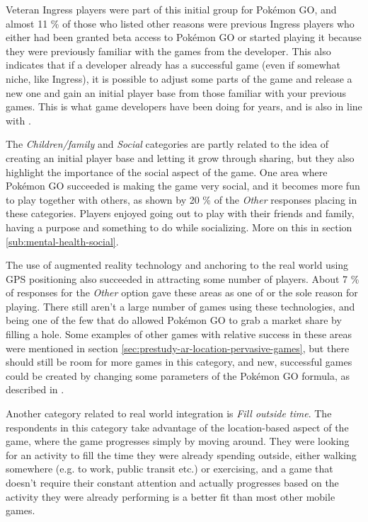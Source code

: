 Veteran Ingress players were part of this initial group for Pokémon GO, and almost 11 \% of those who listed other reasons were previous Ingress players who either had been granted beta access to Pokémon GO or started playing it because they were previously familiar with the games from the developer. This also indicates that if a developer already has a successful game (even if somewhat niche, like Ingress), it is possible to adjust some parts of the game and release a new one and gain an initial player base from those familiar with your previous games. This is what game developers have been doing for years, and is also in line with .

The \emph{Children/family} and \emph{Social} categories are partly related to the idea of creating an initial player base and letting it grow through sharing, but they also highlight the importance of the social aspect of the game. One area where Pokémon GO succeeded is making the game very social, and it becomes more fun to play together with others, as shown by 20 \% of the \emph{Other} responses placing in these categories. Players enjoyed going out to play with their friends and family, having a purpose and something to do while socializing. More on this in section \ref{sub:mental-health-social}. 

The use of augmented reality technology and anchoring to the real world using GPS positioning also succeeded in attracting some number of players. About 7 \% of responses for the \emph{Other} option gave these areas as one of or the sole reason for playing. There still aren't a large number of games using these technologies, and being one of the few that do allowed Pokémon GO to grab a market share by filling a hole. Some examples of other games with relative success in these areas were mentioned in section \ref{sec:prestudy-ar-location-pervasive-games}, but there should still be room for more games in this category, and new, successful games could be created by changing some parameters of the Pokémon GO formula, as described in .

Another category related to real world integration is \emph{Fill outside time}. The respondents in this category take advantage of the location-based aspect of the game, where the game progresses simply by moving around. They were looking for an activity to fill the time they were already spending outside, either walking somewhere (e.g. to work, public transit etc.) or exercising, and a game that doesn't require their constant attention and actually progresses based on the activity they were already performing is a better fit than most other mobile games.

